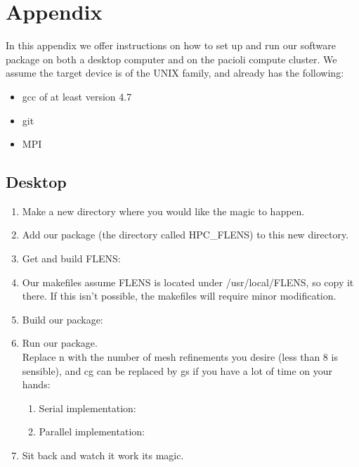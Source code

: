 \newpage
\appendix
\section{Appendix}

In this appendix we offer instructions on how to set up and run our software package on both a desktop computer and on the pacioli compute cluster. We assume the target device is of the UNIX family, and already has the following:

\begin{itemize}
   \item gcc of at least version 4.7
   \item git
   \item MPI
\end{itemize}

\subsection{Desktop}

\begin{enumerate}
   \item Make a new directory where you would like the magic to happen.
   \item Add our package (the directory called HPC\_FLENS) to this new directory.
   \item Get and build FLENS: 
   
   \item Our makefiles assume FLENS is located under /usr/local/FLENS, so copy it there. If this isn't possible, the makefiles will require minor modification.
   
   \item Build our package:
   
   \item Run our package.\\
   Replace n with the number of mesh refinements you desire (less than 8 is sensible), and cg can be replaced by gs if you have a lot of time on your hands:
   
   \begin{enumerate}
   
      \item Serial implementation:
      \item Parallel implementation:
      
   \end{enumerate}
   
   \item Sit back and watch it work its magic.
\end{enumerate}
      
